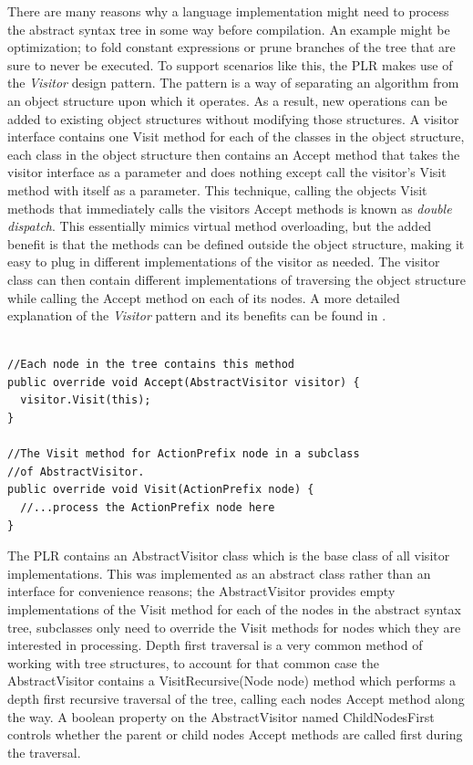 	There are many reasons why a language implementation might need to process 
	the abstract syntax tree in some way before compilation. An example might be 
	optimization; to fold constant expressions or prune branches of the tree 
	that are sure to never be executed. To support scenarios like this, the PLR 
	makes use of the \textit{Visitor} design pattern. The pattern is a way of 
	separating an algorithm from an object structure upon which it operates. As 
	a result, new operations can be added to existing object structures without 
	modifying those structures. A visitor interface contains one \textsf{Visit} 
	method for each of the classes in the object structure, each class in the 
	object structure then contains an \textsf{Accept} method that takes the 
	visitor interface as a parameter and does nothing 
	except call the visitor's \textsf{Visit} method with itself as a parameter. 
  This technique, calling the objects \textsf{Visit} methods that immediately
  calls the visitors \textsf{Accept} methods is known as \textit{double 
  dispatch}. This essentially mimics virtual method overloading, but the added
  benefit is that the methods can be defined outside the object structure, 
  making it easy to plug in different implementations of the visitor as needed.
  The visitor class can then contain different implementations of traversing
  the object structure while calling the \textsf{Accept} method on each of its 
  nodes. A more detailed explanation of the \textit{Visitor} pattern and its 
	benefits can be found in \cite{design_patterns, visitor}.

	\begin{lstlisting}[caption=Examples of Visit and Accept methods]
  
//Each node in the tree contains this method
public override void Accept(AbstractVisitor visitor) {
  visitor.Visit(this);
}
  
//The Visit method for ActionPrefix node in a subclass
//of AbstractVisitor. 
public override void Visit(ActionPrefix node) {
  //...process the ActionPrefix node here
}
\end{lstlisting}
  
  The PLR contains an \textsf{AbstractVisitor} class which is the base class
  of all visitor implementations. This was implemented as an abstract class
  rather than an interface for convenience reasons; the 
  \textsf{AbstractVisitor} provides empty implementations of the \textsf{Visit}
  method for each of the nodes in the abstract syntax tree, subclasses only
  need to override the \textsf{Visit} methods for nodes which they
  are interested in processing. Depth first traversal is a very common method
  of working with tree structures, to account for that common case the 
  \textsf{AbstractVisitor} contains a \textsf{VisitRecursive(Node node)} 
  method which performs a depth first recursive traversal of the tree, calling 
  each nodes \textsf{Accept} method along the way. A  boolean property on the 
  \textsf{AbstractVisitor} named \textsf{ChildNodesFirst} controls whether the 
  parent or child nodes \textsf{Accept} methods are called first during the 
  traversal.  
  

